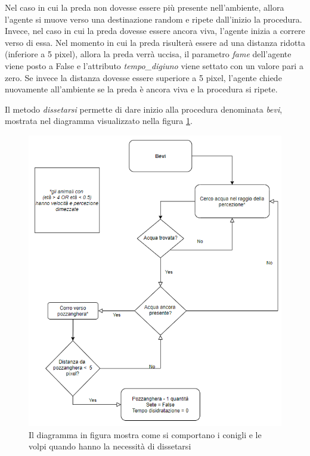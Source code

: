 \documentclass[11pt]{article}
\begin{document}
Nel caso in cui la preda non dovesse essere più presente nell'ambiente, allora l'agente si muove verso una destinazione random e ripete dall'inizio la procedura. Invece, nel caso in cui la preda dovesse essere ancora viva, l'agente inizia a correre verso di essa. Nel momento in cui la preda risulterà essere ad una distanza ridotta (inferiore a 5 pixel), allora la preda verrà uccisa, il parametro \emph{fame} dell'agente viene posto a False e l'attributo \emph{tempo\_digiuno} viene settato con un valore pari a zero. Se invece la distanza dovesse essere superiore a 5 pixel, l'agente chiede nuovamente all'ambiente se la preda è ancora viva e la procedura si ripete. 

Il metodo \emph{dissetarsi} permette di dare inizio alla procedura denominata \emph{bevi}, mostrata nel diagramma visualizzato nella figura \ref{fig:diagrammaBevi}. 
\begin{figure}
     \centering
     \includegraphics[scale = 0.75]{Sete.png}
     \caption{Il diagramma in figura mostra come si comportano i conigli e le volpi quando hanno la necessità di dissetarsi}
     \label{fig:diagrammaBevi}
\end{figure}
\end{document}
